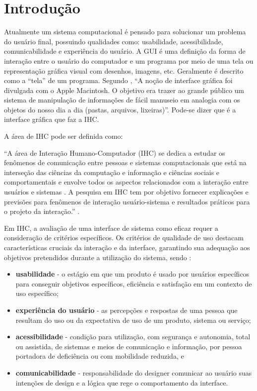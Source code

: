 \chapter[Introdução]{Introdução}
\label{capIntro}

Atualmente um sistema computacional é pensado para solucionar um problema do usuário final, possuindo qualidades como: usabilidade, acessibilidade, comunicabilidade e experiência do usuário. A \ac{GUI} é uma definição da forma de interação entre o usuário do computador e um programa por meio de uma tela ou representação gráfica visual com desenhos, imagens, etc. Geralmente é descrito como a “tela” de um programa. Segundo , “A noção de interface gráfica foi divulgada com o Apple Macintosh. O objetivo era trazer ao grande público um sistema de manipulação de informações de fácil manuseio em analogia com os objetos do nosso dia a dia (pastas, arquivos, lixeiras)”.
Pode-se dizer que é a interface gráfica que faz a \ac{IHC}.

A área de \ac{IHC} pode ser definida como:
 \begin{citacao}
“A área de Interação Humano-Computador (\acs{IHC}) se dedica a estudar os fenômenos de comunicação entre pessoas e sistemas computacionais que está na interseção das ciências da computação e informação e ciências sociais e comportamentais e envolve todos os aspectos relacionados com a interação entre usuários e sistemas . A pesquisa em \acs{IHC} tem por objetivo fornecer explicações e previsões para fenômenos de interação usuário-sistema e resultados práticos para o projeto da interação.” \cite{sbcihc}.
\end{citacao}


Em \acs{IHC}, a avaliação de uma interface de sistema como eficaz requer a consideração de critérios específicos. Os critérios de qualidade de uso destacam características cruciais da interação e da interface, garantindo sua adequação aos objetivos pretendidos durante a utilização do sistema, sendo \cite{barbosa2010interaccao}:
\begin{itemize}
    \item \textbf{usabilidade} - o estágio em que um produto é usado por usuários específicos para conseguir objetivos específicos, eficiência e satisfação em um contexto de uso específico;
    \item \textbf{experiência do usuário} - as percepções e respostas de uma pessoa que resultam do uso ou da expectativa de uso de um produto, sistema ou serviço;
    \item \textbf{acessibilidade} - condição para utilização, com segurança e autonomia, total ou assistida, de sistemas e meios de comunicação e informação, por pessoa portadora de deficiência ou com mobilidade reduzida, e
    \item \textbf{comunicabilidade} - responsabilidade do designer comunicar ao usuário suas intenções de design e a lógica que rege o comportamento da interface.
\end{itemize}

